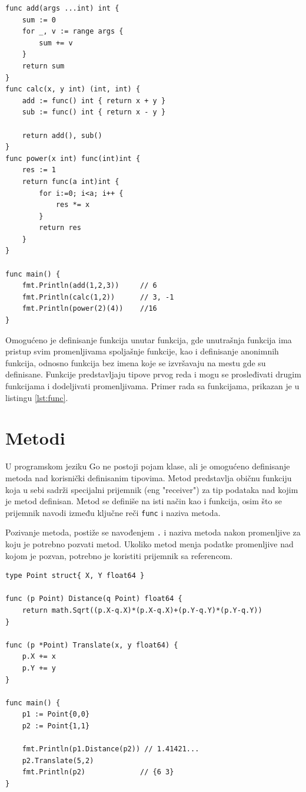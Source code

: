\documentclass[12pt,oneside]{memoir}
\begin{document}
\begin{center}
\begin{lstlisting}[caption=Primer koji demonstrira rad sa funkcijama, label={lst:func},  backgroundcolor=\color{background}]
func add(args ...int) int {
	sum := 0
	for _, v := range args {
		sum += v
	}
	return sum
}
func calc(x, y int) (int, int) {
	add := func() int { return x + y }
	sub := func() int { return x - y }

	return add(), sub()
}	
func power(x int) func(int)int {
	res := 1
	return func(a int)int {
		for i:=0; i<a; i++ {
			res *= x
		}
		return res
	}
}

func main() {
	fmt.Println(add(1,2,3))		// 6
	fmt.Println(calc(1,2)) 		// 3, -1
	fmt.Println(power(2)(4))	//16
}
\end{lstlisting}
\end{center}

Omogućeno je definisanje funkcija unutar funkcija, gde unutrašnja funkcija ima pristup svim promenljivama spoljašnje funkcije, kao i  definisanje anonimnih funkcija, odnosno funkcija bez imena koje se izvršavaju na mestu gde su definisane. Funkcije predstavljaju tipove prvog reda i mogu se prosleđivati drugim funkcijama i dodeljivati promenljivama. Primer rada sa funkcijama, prikazan je u listingu \ref{lst:func}.



\section{Metodi}  \label{metod}

U programskom jeziku Go ne postoji pojam klase, ali je omogućeno definisanje metoda nad korisnički definisanim tipovima. Metod predstavlja običnu funkciju koja u sebi sadrži specijalni prijemnik (eng "receiver") za tip podataka nad kojim je metod definisan. Metod se definiše na isti način kao i funkcija, osim što se prijemnik navodi između ključne reči \texttt{func} i naziva metoda.

Pozivanje metoda, postiže se navođenjem \texttt{.} i naziva metoda nakon promenljive za koju je potrebno pozvati metod. Ukoliko metod menja podatke promenljive nad kojom je pozvan, potrebno je koristiti prijemnik sa referencom. 

\begin{center}
\begin{lstlisting}[caption=Primer koji demonstrira rad sa metodima, label={lst:metod},  backgroundcolor=\color{background}]
type Point struct{ X, Y float64 }

func (p Point) Distance(q Point) float64 {
	return math.Sqrt((p.X-q.X)*(p.X-q.X)+(p.Y-q.Y)*(p.Y-q.Y))
}

func (p *Point) Translate(x, y float64) {
	p.X += x
	p.Y += y
}

func main() {
	p1 := Point{0,0}
	p2 := Point{1,1}

	fmt.Println(p1.Distance(p2)) // 1.41421...
	p2.Translate(5,2)
	fmt.Println(p2)				// {6 3}
}
\end{lstlisting}
\end{center}
 
\end{document}
